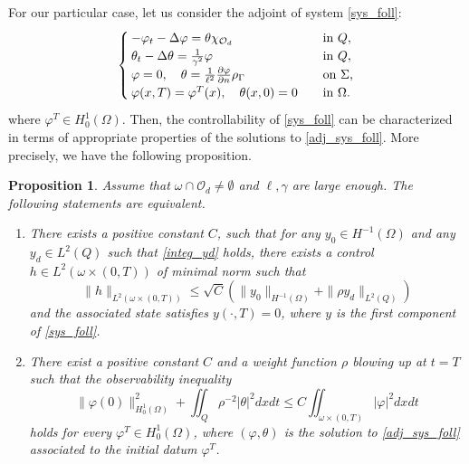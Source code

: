 \documentclass[preprint,10pt]{article}
\newtheorem{proposition}[theorem]{Proposition}
\numberwithin{equation}{section}
\numberwithin{theorem}{section}
\def\csbd{\rho_{\Gamma}}
\begin{document}
{For our particular case, let us consider the adjoint of system \eqref{sys_foll}:
%
\begin{equation}\label{adj_sys_foll}
\begin{cases}
-\varphi_t-\Delta \varphi= \theta\chi_{\mathcal O_d} \quad&\textnormal{in }Q, \\
\theta_t-\Delta \theta=\frac{1}{\gamma^2}\varphi \quad& \textnormal{in }Q, \\
\varphi=0, \quad \theta=\frac{1}{\ell^2}\frac{\partial \varphi}{\partial n}\csbd \quad &\textnormal{on $\Sigma$,} \\
\varphi(x,T)=\varphi^T(x), \quad \theta(x,0)=0 \quad &\textnormal{in $\Omega$}.
\end{cases}
\end{equation}
%
where $\varphi^T\in H^{1}_0(\Omega)$. Then, the controllability of \eqref{sys_foll} can be characterized in terms of appropriate properties of the solutions to \eqref{adj_sys_foll}. More precisely, we have the following proposition.

\begin{proposition}\label{prop_control}
Assume that $\omega\cap\mathcal O_d\neq \emptyset$ and $\ell,\gamma$ are large enough. The following statements are equivalent.
%
\begin{enumerate}
\item There exists a positive constant $C$, such that for any $y_0\in H^{-1}(\Omega)$ and any $y_d\in L^2(Q)$ such that \eqref{integ_yd} holds, there exists a control $h\in L^2(\omega\times(0,T))$ of minimal norm such that 
%
\begin{equation*}
\|h\|_{L^2(\omega\times(0,T))}\leq \sqrt C\left(\|y_0\|_{H^{-1}(\Omega)}+\|\rho y_d\|_{L^2(Q)}\right)
\end{equation*}
%
and the associated state satisfies $y(\cdot,T)=0$, where $y$ is the first component of \eqref{sys_foll}.  
%
\item There exist a positive constant $C$ and a weight function $\rho$ blowing up at $t=T$ such that the observability inequality 
%
\begin{equation}\label{obs_ineq_1}
\|\varphi(0)\|_{H^1_{0}(\Omega)}^2+\iint_Q \rho^{-2}|\theta|^2dxdt\leq C\iint_{\omega\times(0,T)}|\varphi|^2dxdt
\end{equation}
%
holds for every $\varphi^T\in H^1_{0}(\Omega)$, where $(\varphi,\theta)$ is the solution to \eqref{adj_sys_foll} associated to the initial datum $\varphi^T$. 
\end{enumerate}
%
\end{proposition}

}
\end{document}
